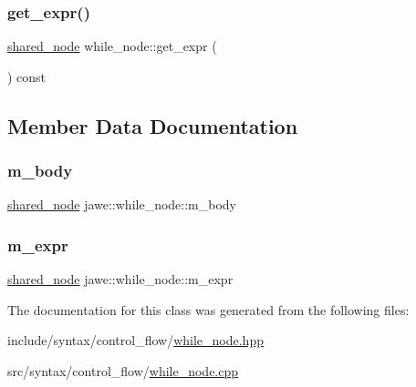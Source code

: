 \mbox{\label{classjawe_1_1while__node_abc4f85cf974d2bec81c4390beb841424}} 
\subsubsection{\texorpdfstring{get\+\_\+expr()}{get\_expr()}}
{\footnotesize\ttfamily \hyperlink{namespacejawe_a3f307481d921b6cbb50cc8511fc2b544}{shared\+\_\+node} while\+\_\+node\+::get\+\_\+expr (\begin{DoxyParamCaption}{ }\end{DoxyParamCaption}) const}



\subsection{Member Data Documentation}
\mbox{\label{classjawe_1_1while__node_a3590c1ed4ea3ec0ec1fea586b6528774}} 
\subsubsection{\texorpdfstring{m\+\_\+body}{m\_body}}
{\footnotesize\ttfamily \hyperlink{namespacejawe_a3f307481d921b6cbb50cc8511fc2b544}{shared\+\_\+node} jawe\+::while\+\_\+node\+::m\+\_\+body\hspace{0.3cm}{\ttfamily [private]}}

\mbox{\label{classjawe_1_1while__node_a4be0429acc012ec0afd91722b3a902f1}} 
\subsubsection{\texorpdfstring{m\+\_\+expr}{m\_expr}}
{\footnotesize\ttfamily \hyperlink{namespacejawe_a3f307481d921b6cbb50cc8511fc2b544}{shared\+\_\+node} jawe\+::while\+\_\+node\+::m\+\_\+expr\hspace{0.3cm}{\ttfamily [private]}}



The documentation for this class was generated from the following files\+:\begin{DoxyCompactItemize}
\item 
include/syntax/control\+\_\+flow/\hyperlink{while__node_8hpp}{while\+\_\+node.\+hpp}\item 
src/syntax/control\+\_\+flow/\hyperlink{while__node_8cpp}{while\+\_\+node.\+cpp}\end{DoxyCompactItemize}
